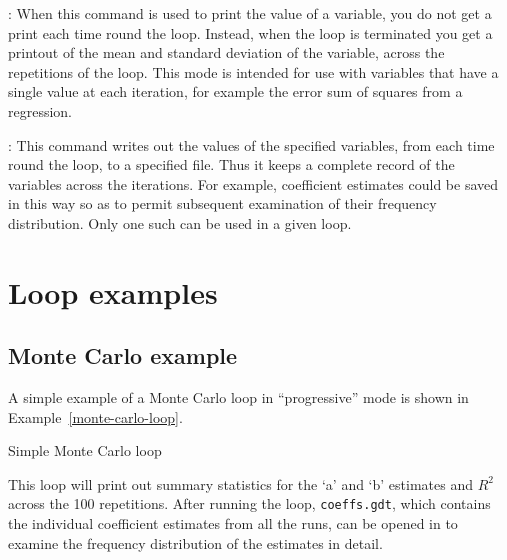 : When this command is used to print the value of a
variable, you do not get a print each time round the loop.  Instead,
when the loop is terminated you get a printout of the mean and
standard deviation of the variable, across the repetitions of the
loop.  This mode is intended for use with variables that have a single
value at each iteration, for example the error sum of squares from a
regression.

: This command writes out the values of the specified
variables, from each time round the loop, to a specified file.  Thus
it keeps a complete record of the variables across the iterations.
For example, coefficient estimates could be saved in this way so as to
permit subsequent examination of their frequency distribution. Only
one such  can be used in a given loop.

\section{Loop examples}
\label{loop-examples}


\subsection{Monte Carlo example}
\label{loop-mc-example}

A simple example of a Monte Carlo loop in ``progressive'' mode is
shown in Example~\ref{monte-carlo-loop}.

\begin{script}[htbp]
  \caption{Simple Monte Carlo loop}
  \label{monte-carlo-loop}
\end{script}

This loop will print out summary statistics for the `a' and `b'
estimates and $R^2$ across the 100 repetitions.  After running the
loop, \verb+coeffs.gdt+, which contains the individual coefficient
estimates from all the runs, can be opened in  to examine
the frequency distribution of the estimates in detail.


